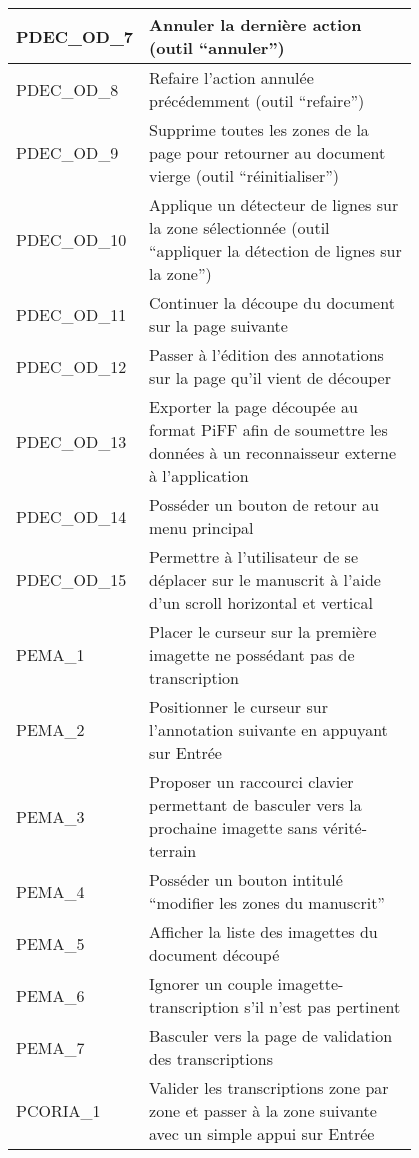 \begin{center}
\begin{tabular}{ | l | p{0.8\linewidth} | }
        \hline
        PDEC\_OD\_7 & Annuler la dernière action (outil “annuler”) \\
        \hline
        PDEC\_OD\_8 & Refaire l’action annulée précédemment (outil “refaire”) \\
        \hline
        PDEC\_OD\_9 & Supprime toutes les zones de la page pour retourner au document vierge (outil “réinitialiser”) \\
        \hline
        PDEC\_OD\_10 & Applique un détecteur de lignes sur la zone sélectionnée (outil “appliquer la détection de lignes sur la zone”) \\
        \hline
        PDEC\_OD\_11 & Continuer la découpe du document sur la page suivante \\
        \hline
        PDEC\_OD\_12 & Passer à l’édition des annotations sur la page qu’il vient de découper \\
        \hline
        PDEC\_OD\_13 & Exporter la page découpée au format PiFF afin de soumettre les données à un reconnaisseur externe à l’application \\
        \hline
        PDEC\_OD\_14 & Posséder un bouton de retour au menu principal \\
        \hline
        PDEC\_OD\_15 & Permettre à l’utilisateur de se déplacer sur le manuscrit à l’aide d’un scroll horizontal et vertical \\
        \hline
        PEMA\_1 & Placer le curseur sur la première imagette ne possédant pas de transcription \\
        \hline
        PEMA\_2 & Positionner le curseur sur l’annotation suivante en appuyant sur Entrée \\
        \hline
        PEMA\_3 & Proposer un raccourci clavier permettant de basculer vers la prochaine imagette sans vérité-terrain \\
        \hline
        PEMA\_4 & Posséder un bouton intitulé “modifier les zones du manuscrit” \\
        \hline
        PEMA\_5 & Afficher la liste des imagettes du document découpé \\
        \hline
        PEMA\_6 & Ignorer un couple imagette-transcription s’il n’est pas pertinent \\
        \hline
        PEMA\_7 & Basculer vers la page de validation des transcriptions \\
        \hline
        PCORIA\_1 & Valider les transcriptions zone par zone et passer à la zone suivante avec un simple appui sur Entrée \\

\end{tabular}
\end{center}
